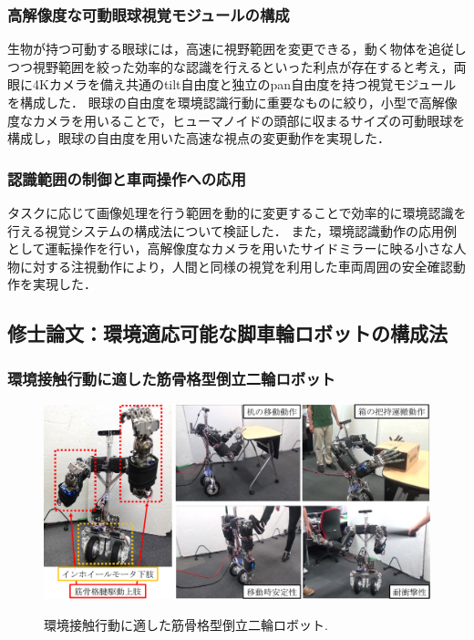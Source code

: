 \documentclass[twocolumn]{d-abst}
\begin{document}
\subsubsection{高解像度な可動眼球視覚モジュールの構成}
生物が持つ可動する眼球には，高速に視野範囲を変更できる，動く物体を追従しつつ視野範囲を絞った効率的な認識を行えるといった利点が存在すると考え，両眼に4Kカメラを備え共通のtilt自由度と独立のpan自由度を持つ視覚モジュールを構成した．
眼球の自由度を環境認識行動に重要なものに絞り，小型で高解像度なカメラを用いることで，ヒューマノイドの頭部に収まるサイズの可動眼球を構成し，眼球の自由度を用いた高速な視点の変更動作を実現した．

\subsubsection{認識範囲の制御と車両操作への応用}
タスクに応じて画像処理を行う範囲を動的に変更することで効率的に環境認識を行える視覚システムの構成法について検証した．
また，環境認識動作の応用例として運転操作を行い，高解像度なカメラを用いたサイドミラーに映る小さな人物に対する注視動作により，人間と同様の視覚を利用した車両周囲の安全確認動作を実現した．%

\subsection{修士論文：環境適応可能な脚車輪ロボットの構成法}

\subsubsection{環境接触行動に適した筋骨格型倒立二輪ロボット}

\begin{figure}[tbh]
 \begin{center}
  \begin{minipage}{0.8\columnwidth}
   \includegraphics[width=\columnwidth]{2_twimp.pdf}
   \caption{環境接触行動に適した筋骨格型倒立二輪ロボット.}
  \end{minipage}
  \label{figure:nowprinting}
 \end{center}
\end{figure}
\end{document}
